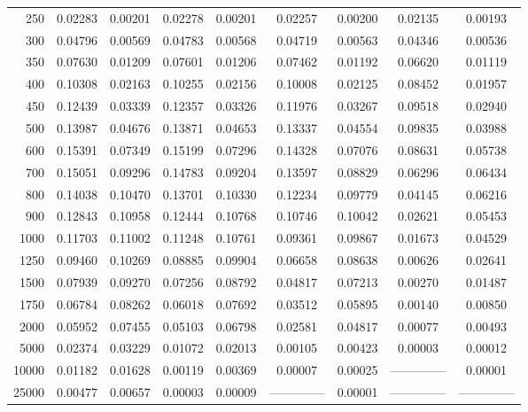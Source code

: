 \begin{table}[ht]
\begin{tabular}{r|c|c|c|c|c|c|c|c}
      250 & 0.02283 & 0.00201 & 0.02278 & 0.00201 & 0.02257 & 0.00200 & 0.02135 & 0.00193 \\
      300 & 0.04796 & 0.00569 & 0.04783 & 0.00568 & 0.04719 & 0.00563 & 0.04346 & 0.00536 \\
      350 & 0.07630 & 0.01209 & 0.07601 & 0.01206 & 0.07462 & 0.01192 & 0.06620 & 0.01119 \\
      400 & 0.10308 & 0.02163 & 0.10255 & 0.02156 & 0.10008 & 0.02125 & 0.08452 & 0.01957 \\
      450 & 0.12439 & 0.03339 & 0.12357 & 0.03326 & 0.11976 & 0.03267 & 0.09518 & 0.02940 \\
      500 & 0.13987 & 0.04676 & 0.13871 & 0.04653 & 0.13337 & 0.04554 & 0.09835 & 0.03988 \\
      600 & 0.15391 & 0.07349 & 0.15199 & 0.07296 & 0.14328 & 0.07076 & 0.08631 & 0.05738 \\
      700 & 0.15051 & 0.09296 & 0.14783 & 0.09204 & 0.13597 & 0.08829 & 0.06296 & 0.06434 \\
      800 & 0.14038 & 0.10470 & 0.13701 & 0.10330 & 0.12234 & 0.09779 & 0.04145 & 0.06216 \\
      900 & 0.12843 & 0.10958 & 0.12444 & 0.10768 & 0.10746 & 0.10042 & 0.02621 & 0.05453 \\
     1000 & 0.11703 & 0.11002 & 0.11248 & 0.10761 & 0.09361 & 0.09867 & 0.01673 & 0.04529 \\
     1250 & 0.09460 & 0.10269 & 0.08885 & 0.09904 & 0.06658 & 0.08638 & 0.00626 & 0.02641 \\
     1500 & 0.07939 & 0.09270 & 0.07256 & 0.08792 & 0.04817 & 0.07213 & 0.00270 & 0.01487 \\
     1750 & 0.06784 & 0.08262 & 0.06018 & 0.07692 & 0.03512 & 0.05895 & 0.00140 & 0.00850 \\
     2000 & 0.05952 & 0.07455 & 0.05103 & 0.06798 & 0.02581 & 0.04817 & 0.00077 & 0.00493 \\
     5000 & 0.02374 & 0.03229 & 0.01072 & 0.02013 & 0.00105 & 0.00423 & 0.00003 & 0.00012 \\
    10000 & 0.01182 & 0.01628 & 0.00119 & 0.00369 & 0.00007 & 0.00025 & -------------- & 0.00001 \\
    25000 & 0.00477 & 0.00657 & 0.00003 & 0.00009 & -------------- & 0.00001 & -------------- & -------------- \\ \cline{1-9}
    \end{tabular}
    \label{tab:XRayEffOCX}
\end{table}


